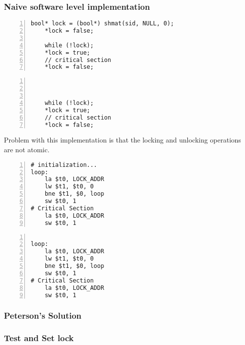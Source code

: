 \documentclass[8pt]{article}
\begin{document}
\subsubsection*{Naive software level implementation}
\begin{minipage}{0.45\linewidth}
\begin{Verbatim}[frame=topline,numbers=left,label= Process 0,framesep=3mm]
    bool* lock = (bool*) shmat(sid, NULL, 0);
    *lock = false;

    while (!lock);
    *lock = true;
    // critical section
    *lock = false;
\end{Verbatim}
\end{minipage}\hfill
\begin{minipage}{0.45\linewidth}
\begin{Verbatim}[frame=topline,numbers=left,label= Process 1,framesep=3mm]



    while (!lock);
    *lock = true;
    // critical section
    *lock = false;
\end{Verbatim}
\end{minipage}\hfill
\par\vspace{3ex}
Problem with this implementation is that the locking and unlocking operations are not atomic.\\
\par\vspace{3ex}
\begin{minipage}{0.45\linewidth}
\begin{Verbatim}[frame=topline,numbers=left,label= Process 0,framesep=3mm]
# initialization...
loop: 
    la $t0, LOCK_ADDR
    lw $t1, $t0, 0 
    bne $t1, $0, loop
    sw $t0, 1
# Critical Section 
    la $t0, LOCK_ADDR
    sw $t0, 1
\end{Verbatim}
\end{minipage}\hfill
\begin{minipage}{0.45\linewidth}
\begin{Verbatim}[frame=topline,numbers=left,label= Process 1,framesep=3mm]

loop: 
    la $t0, LOCK_ADDR
    lw $t1, $t0, 0 
    bne $t1, $0, loop
    sw $t0, 1
# Critical Section 
    la $t0, LOCK_ADDR
    sw $t0, 1
\end{Verbatim}
\end{minipage}\hfill
\subsubsection*{Peterson's Solution}

\subsubsection*{Test and Set lock}
\begin{lstlisting}
    
\end{lstlisting}
\end{document}
